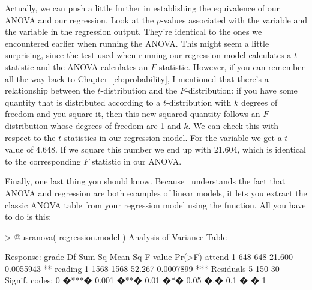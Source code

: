 Actually, we can push a little further in establishing the equivalence of our ANOVA and our regression. Look at the $p$-values associated with the  variable and the  variable in the regression output. They're identical to the ones we encountered earlier when running the ANOVA. This might seem a little surprising, since the test used when running our regression model calculates a $t$-statistic and the ANOVA calculates an $F$-statistic. However, if you can remember all the way back to Chapter~\ref{ch:probability}, I mentioned that there's a relationship between the $t$-distribution and the $F$-distribution: if you have some quantity that is distributed according to a $t$-distribution with $k$ degrees of freedom and you square it, then this new squared quantity follows an $F$-distribution whose degrees of freedom are 1 and $k$. We can check this with respect to the $t$ statistics in our regression model. For the  variable we get a $t$ value of 4.648. If we square this number we end up with 21.604, which is identical to the corresponding $F$ statistic in our ANOVA. 

Finally, one last thing you should know. Because \R\ understands the fact that ANOVA and regression are both examples of linear models, it lets you extract the classic ANOVA table from your regression model using the  function. All you have to do is this:
\begin{rblock1}
> @usr{anova( regression.model )}
Analysis of Variance Table

Response: grade
          Df Sum Sq Mean Sq F value    Pr(>F)    
attend     1    648     648  21.600 0.0055943 ** 
reading    1   1568    1568  52.267 0.0007899 ***
Residuals  5    150      30                      
---
Signif. codes:  0 �***� 0.001 �**� 0.01 �*� 0.05 �.� 0.1 � � 1 
\end{rblock1}



